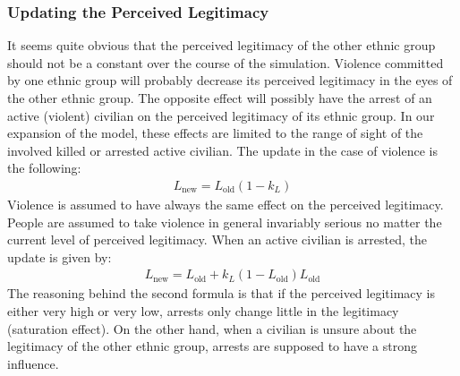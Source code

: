 \documentclass[11pt]{article}
\begin{document}
\subsubsection{Updating the Perceived Legitimacy}
It seems quite obvious that the perceived legitimacy of the other ethnic group should not be a constant over the course of the simulation. Violence committed by one ethnic group will probably decrease its perceived legitimacy in the eyes of the other ethnic group. The opposite effect will possibly have the arrest of an active (violent) civilian on the perceived legitimacy of its ethnic group. In our expansion of the model, these effects are limited to the range of sight of the involved killed or arrested active civilian. The update in the case of violence is the following:
\begin{align}
L_{\text{new}} = L_{\text{old}} \left( 1 - k_L \right)
\label{eqn:update_violence}
\end{align}
Violence is assumed to have always the same effect on the perceived legitimacy. People are assumed to take violence in general invariably serious no matter the current level of perceived legitimacy. When an active civilian is arrested, the update is given by:
\begin{align}
L_{\text{new}} = L_{\text{old}} + k_L \left( 1 - L_{\text{old}} \right) L_{\text{old}}
\label{eqn:update_arrest}
\end{align}
The reasoning behind the second formula is that if the perceived legitimacy is either very high or very low, arrests only change little in the legitimacy (saturation effect). On the other hand, when a civilian is unsure about the legitimacy of the other ethnic group, arrests are supposed to have a strong influence.
\end{document}
